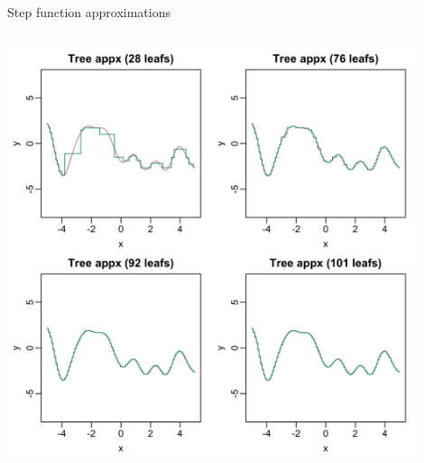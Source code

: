\documentclass[aspectratio=199]{beamer}
\begin{document}
\begin{frame}{Step function approximations}

\begin{columns}
\centering
\begin{column}{0.4\textwidth}
\centering
\includegraphics[width = 0.9\textwidth]{figures/tree_appx}
\end{column}


\end{columns}
\end{frame}
\end{document}
